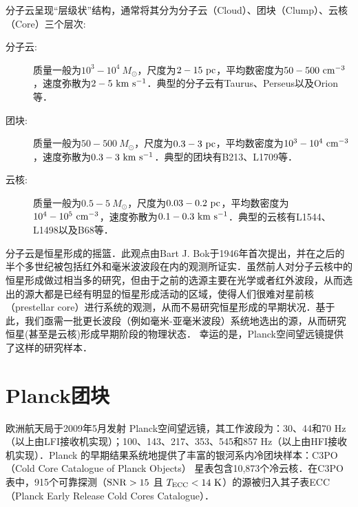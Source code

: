 \documentclass[UTF8, nocolorlinks]{pkuthss}
\begin{document}
		分子云呈现“层级状”结构\supercite{1994ApJ...423..681V}，通常将其分为分子云（Cloud）、团块（Clump）、云核（Core）三个层次\supercite{2007ARA&A..45..339B,2000prpl.conf...97W}:
		\begin{adjustwidth}{0.5cm}{0cm}
		\begin{description}
			\item[分子云:] 质量一般为$10^3-10^4\ M_{\odot}$，尺度为$2-15\rm\ pc$，平均数密度为$50-500\rm\ cm^{-3}$，速度弥散为$2- 5\rm\ km\ s^{-1}$\supercite{2007ARA&A..45..339B}．典型的分子云有Taurus、Perseus以及Orion等．

			\item[团块:] 质量一般为$50-500\ M_{\odot}$，尺度为$0.3-3\rm\ pc$，平均数密度为$10^3-10^4\rm\ cm^{-3}$，速度弥散为$0.3- 3\rm\ km\ s^{-1}$\supercite{2007ARA&A..45..339B}．典型的团块有B213、L1709等\supercite{2007ARA&A..45..339B}．

			\item[云核:] 质量一般为$0.5-5\ M_{\odot}$，尺度为$0.03-0.2\rm\ pc$，平均数密度为$10^4-10^5\rm\ cm^{-3}$，速度弥散为$0.1- 0.3\rm\ km\ s^{-1}$\supercite{2007ARA&A..45..339B}．典型的云核有L1544、L1498以及B68等\supercite{2007ARA&A..45..339B}．
		\end{description}
		\end{adjustwidth}

		分子云是恒星形成的摇篮．此观点由Bart J. Bok于1946年首次提出\supercite{1948HarMo...7...53B}，并在之后的半个多世纪被包括红外和毫米波波段在内的观测所证实\supercite{shu1987star,2007ARA&A..45..339B}．虽然前人对分子云核中的恒星形成做过相当多的研究，但由于之前的选源主要在光学或者红外波段，从而选出的源大都是已经有明显的恒星形成活动的区域，使得人们很难对星前核（prestellar core）进行系统的观测，从而不易研究恒星形成的早期状况．基于此，我们亟需一批更长波段（例如毫米-亚毫米波段）系统地选出的源，从而研究恒星(甚至是云核)形成早期阶段的物理状态． 幸运的是，Planck空间望远镜提供了这样的研究样本．

	\section{Planck团块}

		欧洲航天局于2009年5月发射 Planck空间望远镜，其工作波段为：30、44和70 Hz（以上由LFI接收机实现）；100、143、217、353、545和857 Hz（以上由HFI接收机实现）\supercite{2011A&A...536A...1P}．Planck 的早期结果系统地提供了丰富的银河系内冷团块样本：C3PO（Cold Core Catalogue of Planck Objects） 星表包含10,873个冷云核\supercite{2011yCat.8088....0P,2011A&A...536A..23P}．在C3PO表中，915个可靠探测（$\rm SNR>15$ 且 $T_{\rm ECC}<14\rm\ K$）的源被归入其子表ECC（Planck Early Release Cold Cores Catalogue）\supercite{2011yCat.8088....0P,2011A&A...536A..23P}．
\end{document}
